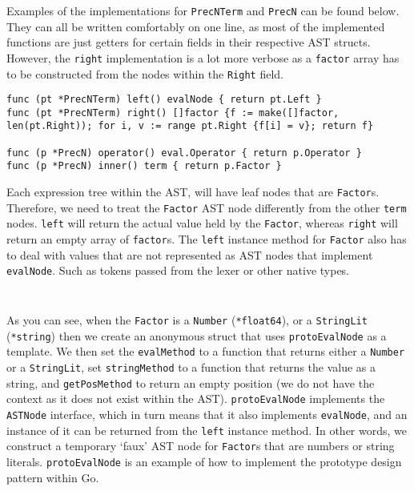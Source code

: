 \inputminted[firstline=51, lastline=92, autogobble, breaklines, tabsize=4]{go}{../../src/parser/eval_expression.go}

Examples of the implementations for \verb|PrecNTerm| and \verb|PrecN| can be found below. They can all be written comfortably on one line, as most of the implemented functions are just getters for certain fields in their respective AST structs. However, the \verb|right| implementation is a lot more verbose as a \verb|factor| array has to be constructed from the nodes within the \verb|Right| field.

\begin{verbatim}    
func (pt *PrecNTerm) left() evalNode { return pt.Left }
func (pt *PrecNTerm) right() []factor {f := make([]factor, len(pt.Right)); for i, v := range pt.Right {f[i] = v}; return f}

func (p *PrecN) operator() eval.Operator { return p.Operator }
func (p *PrecN) inner() term { return p.Factor }
\end{verbatim}

Each expression tree within the AST, will have leaf nodes that are \verb|Factor|s. Therefore, we need to treat the \verb|Factor| AST node differently from the other \verb|term| nodes. \verb|left| will return the actual value held by the \verb|Factor|, whereas \verb|right| will return an empty array of \verb|factor|s. The \verb|left| instance method for \verb|Factor| also has to deal with values that are not represented as AST nodes that implement \verb|evalNode|. Such as tokens passed from the lexer or other native types.

\inputminted[firstline=32, lastline=49, autogobble, breaklines, tabsize=4]{go}{../../src/parser/eval_expression.go}

\inputminted[firstline=130, lastline=179, autogobble, breaklines, tabsize=4]{go}{../../src/parser/eval_expression.go}

As you can see, when the \verb|Factor| is a \verb|Number| (\texttt{*float64}), or a \verb|StringLit| (\texttt{*string}) then we create an anonymous struct that uses \verb|protoEvalNode| as a template. We then set the \verb|evalMethod| to a function that returns either a \verb|Number| or a \verb|StringLit|, set \verb|stringMethod| to a function that returns the value as a string, and \verb|getPosMethod| to return an empty position (we do not have the context as it does not exist within the AST). \verb|protoEvalNode| implements the \verb|ASTNode| interface, which in turn means that it also implements \verb|evalNode|, and an instance of it can be returned from the \verb|left| instance method. In other words, we construct a temporary `faux' AST node for \verb|Factor|s that are numbers or string literals. \verb|protoEvalNode| is an example of how to implement the prototype design pattern\textsuperscript{\cite{prototype_2022}} within Go.


